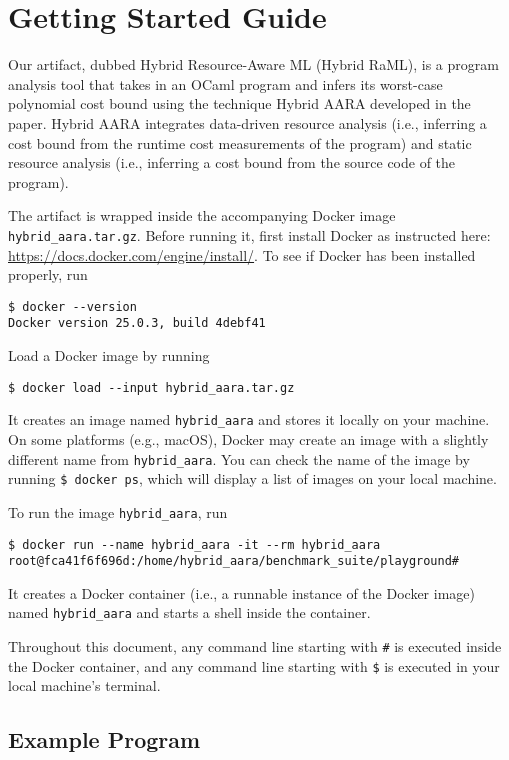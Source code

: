 
\section{Getting Started Guide}

Our artifact, dubbed Hybrid Resource-Aware ML (Hybrid RaML), is a program analysis tool
that takes in an OCaml program and infers its worst-case polynomial cost bound
using the technique Hybrid AARA developed in the paper.
%
Hybrid AARA integrates data-driven resource analysis (i.e., inferring a cost
bound from the runtime cost measurements of the program) and static resource
analysis (i.e., inferring a cost bound from the source code of the program).

The artifact is wrapped inside the accompanying Docker image
\texttt{hybrid\_aara.tar.gz}.
%
Before running it, first install Docker as instructed here:
\url{https://docs.docker.com/engine/install/}.
%
To see if Docker has been installed properly, run
\begin{verbatim}
$ docker --version
Docker version 25.0.3, build 4debf41
\end{verbatim}

Load a Docker image by running
\begin{verbatim}
$ docker load --input hybrid_aara.tar.gz
\end{verbatim}
%
It creates an image named \texttt{hybrid\_aara} and stores it locally on your
machine.
%
On some platforms (e.g., macOS), Docker may create an image with a slightly
different name from \texttt{hybrid\_aara}.
%
You can check the name of the image by running \verb|$ docker ps|, which will
display a list of images on your local machine.

To run the image \texttt{hybrid\_aara}, run
\begin{verbatim}
$ docker run --name hybrid_aara -it --rm hybrid_aara
root@fca41f6f696d:/home/hybrid_aara/benchmark_suite/playground#
\end{verbatim}
%
It creates a Docker container (i.e., a runnable instance of the Docker image)
named \texttt{hybrid\_aara} and starts a shell inside the container.

Throughout this document, any command line starting with \texttt{\#} is executed
inside the Docker container, and any command line starting with \texttt{\$} is
executed in your local machine's terminal.

\subsection{Example Program}

